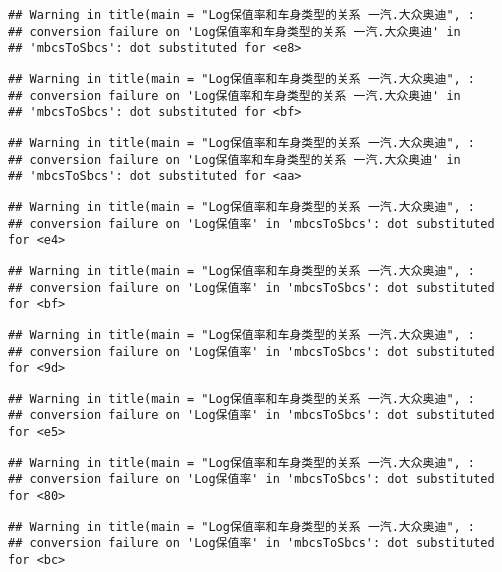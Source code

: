 \documentclass[]{article}
\begin{document}
\begin{verbatim}
## Warning in title(main = "Log保值率和车身类型的关系 一汽.大众奥迪", :
## conversion failure on 'Log保值率和车身类型的关系 一汽.大众奥迪' in
## 'mbcsToSbcs': dot substituted for <e8>
\end{verbatim}

\begin{verbatim}
## Warning in title(main = "Log保值率和车身类型的关系 一汽.大众奥迪", :
## conversion failure on 'Log保值率和车身类型的关系 一汽.大众奥迪' in
## 'mbcsToSbcs': dot substituted for <bf>
\end{verbatim}

\begin{verbatim}
## Warning in title(main = "Log保值率和车身类型的关系 一汽.大众奥迪", :
## conversion failure on 'Log保值率和车身类型的关系 一汽.大众奥迪' in
## 'mbcsToSbcs': dot substituted for <aa>
\end{verbatim}

\begin{verbatim}
## Warning in title(main = "Log保值率和车身类型的关系 一汽.大众奥迪", :
## conversion failure on 'Log保值率' in 'mbcsToSbcs': dot substituted for <e4>
\end{verbatim}

\begin{verbatim}
## Warning in title(main = "Log保值率和车身类型的关系 一汽.大众奥迪", :
## conversion failure on 'Log保值率' in 'mbcsToSbcs': dot substituted for <bf>
\end{verbatim}

\begin{verbatim}
## Warning in title(main = "Log保值率和车身类型的关系 一汽.大众奥迪", :
## conversion failure on 'Log保值率' in 'mbcsToSbcs': dot substituted for <9d>
\end{verbatim}

\begin{verbatim}
## Warning in title(main = "Log保值率和车身类型的关系 一汽.大众奥迪", :
## conversion failure on 'Log保值率' in 'mbcsToSbcs': dot substituted for <e5>
\end{verbatim}

\begin{verbatim}
## Warning in title(main = "Log保值率和车身类型的关系 一汽.大众奥迪", :
## conversion failure on 'Log保值率' in 'mbcsToSbcs': dot substituted for <80>
\end{verbatim}

\begin{verbatim}
## Warning in title(main = "Log保值率和车身类型的关系 一汽.大众奥迪", :
## conversion failure on 'Log保值率' in 'mbcsToSbcs': dot substituted for <bc>
\end{verbatim}
\end{document}
